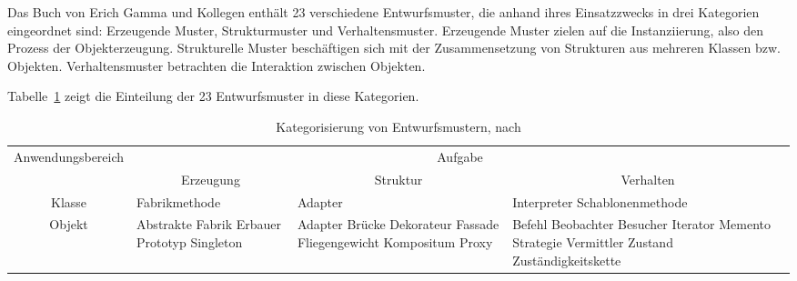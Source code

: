 \pagebreak %

Das Buch  von Erich Gamma und Kollegen enthält 23 verschiedene Entwurfsmuster, die anhand ihres Einsatzzwecks in drei Kategorien eingeordnet sind: Erzeugende Muster, Strukturmuster und Verhaltensmuster. Erzeugende Muster zielen auf die Instanziierung, also den Prozess der Objekterzeugung. Strukturelle Muster beschäftigen sich mit der Zusammensetzung von Strukturen aus mehreren Klassen bzw. Objekten. Verhaltensmuster betrachten die Interaktion zwischen Objekten.

\vspace{2mm} %

Tabelle~\ref{table:entwurfsmuster_katalogisierung} zeigt die Einteilung der 23 Entwurfsmuster in diese Kategorien.

\vspace{\baselineskip} %

\begin{table}[ht]
	\setlength{\tabcolsep}{5pt}
	\renewcommand{\arraystretch}{1.5}
	
	\centering
	\small
	
	\begin{tabular}{ |c||p{2.7cm}|p{2.3cm}|p{3.0cm}| }
		\hline
		\multirow{2}{6em}{\centering Anwendungs\-bereich} & \multicolumn{3}{c|}{Aufgabe} \\
		\cline{2-4}
		& \multicolumn{1}{c|}{Erzeugung}
		& \multicolumn{1}{c|}{Struktur} & \multicolumn{1}{c|}{Verhalten} \\
		\hline
		\hline
		Klasse & Fabrikmethode & Adapter & Interpreter \newline Schablonenmethode \\
		\hline
		Objekt & Abstrakte Fabrik \newline Erbauer \newline Prototyp \newline Singleton
		& Adapter \newline Brücke \newline Dekorateur \newline Fassade \newline Fliegengewicht \newline Kompositum \newline Proxy
		& Befehl \newline Beobachter \newline Besucher \newline Iterator \newline Memento \newline Strategie \newline Vermittler \newline Zustand \newline Zuständigkeitskette \\
		\hline
	\end{tabular}
	\caption{Kategorisierung von Entwurfsmustern, nach \cite[14]{gam11}}
	\label{table:entwurfsmuster_katalogisierung}
\end{table}


